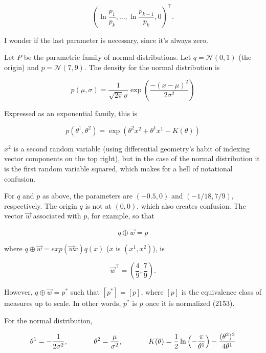 \documentclass[12pt]{article}
\begin{document}
\begin{equation}
  \label{eq:eemaepie}
  \left(\ln\frac{p_{1}}{p_{k}},{\ldots},\ln\frac{p_{k-1}}{p_{k}},0\right)^{\intercal}.
\end{equation}

I wonder if the last parameter is necessary, since it's always zero.

Let $P$ be the parametric family of normal distributions. Let
$q=\mathcal{N}(0,1)$ (the origin) and $p=\mathcal{N}(7,9)$. The
density for the normal distribution is

\begin{equation}
  \label{eq:balahghe}
  p(\mu,\sigma)=\frac{1}{\sqrt{2\pi}\sigma}\exp\left(\frac{-(x-\mu)^{2}}{2\sigma^{2}}\right)
\end{equation}

Expressed as an exponential family, this is

\begin{equation}
  \label{eq:gexahmai}
  p(\theta^{1},\theta^{2})=\exp\left(\theta^{2}x^{2}+\theta^{1}x^{1}-K(\theta)\right)
\end{equation}

$x^{2}$ is a second random variable (using differential geometry's
habit of indexing vector components on the top right), but in the case
of the normal distribution it is the first random variable squared,
which makes for a hell of notational confusion.

For $q$ and $p$ as above, the parameters are $(-0.5,0)$ and
$(-1/18,7/9)$, respectively. The origin $q$ is not at $(0,0)$, which
also creates confusion. The vector $\vec{w}$ associated with $p$, for
example, so that

\begin{equation}
  \label{eq:aelayele}
  q\oplus{}\vec{w}=p
\end{equation}

where $q\oplus{}\vec{w}=exp(\vec{w}x)q(x)$ ($x$ is $(x^{1},x^{2})$),
is

\begin{equation}
  \label{eq:iiwiriew}
  \vec{w}^{\intercal}=\left(\frac{4}{9},\frac{7}{9}\right).
\end{equation}

However, $q\oplus{}\vec{w}=p^{\ast}$ such that $[p^{\ast}]=[p]$, where
$[p]$ is the equivalence class of measures up to scale. In other
words, $p^{\ast}$ is $p$ once it is normalized (2153).

For the normal distribution,

\begin{equation}
  \label{eq:ooleengu}
  \theta^{1}=-\frac{1}{2\sigma^{2}},\hspace{.5in}\theta^{2}=\frac{\mu}{\sigma^{2}},\hspace{.5in}K(\theta)=\frac{1}{2}\ln\left(-\frac{\pi}{\theta^{1}}\right)-\frac{(\theta^{2})^{2}}{4\theta^{1}}
\end{equation}
\end{document}
